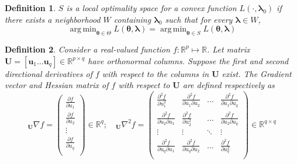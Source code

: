 \documentclass[12pt]{article}
\newtheorem{definition}{Definition}
\DeclareMathOperator*{\argmin}{arg\,min}
\begin{document}
\begin{definition}
$S$ is a local optimality space for a convex function $L(\cdot, \boldsymbol \lambda_0)$ if there exists a neighborhood $W$ containing $\boldsymbol \lambda_0$ such that for every $\boldsymbol \lambda \in W$,
\begin{equation}
\argmin_{\boldsymbol \theta \in \Theta} L(\boldsymbol \theta, \boldsymbol \lambda) =
\argmin_{\boldsymbol \theta \in S} L(\boldsymbol \theta, \boldsymbol \lambda)
\end{equation}
\end{definition}

\begin{definition}
Consider a real-valued function $f: \mathbb{R}^p \mapsto \mathbb{R}$. Let matrix $\boldsymbol U = [ \boldsymbol u_1 \hdots \boldsymbol u_q ] \in \mathbb{R}^{p \times q}$ have orthonormal columns. Suppose the first and second directional derivatives of $f$ with respect to the columns in $\boldsymbol U$ exist. The Gradient vector and Hessian matrix of $f$ with respect to $\boldsymbol U$ are defined respectively as
\begin{equation}\label{eq:hess}
_{\boldsymbol U} \nabla f  =
\left (
\begin{array}{c}
\frac{\partial f}{\partial  u_1} \\
\frac{\partial f}{\partial u_2} \\
\vdots\\
\frac{\partial f}{\partial u_q}\\
\end{array}
\right ) \in \mathbb{R}^q;
\quad
_{\boldsymbol U}\nabla^2 f =
\left (
\begin{array}{cccc}
\frac{\partial^2 f}{\partial u_1^2} & \frac{\partial^2 f}{\partial u_1 \partial u_2} & ...  & \frac{\partial^2 f}{\partial u_1 \partial u_q} \\
\frac{\partial^2 f}{\partial u_2 \partial u_1} & \frac{\partial^2 f}{\partial u_2^2} & ...  & \frac{\partial^2 f}{\partial u_2 \partial u_q} \\
\vdots & \vdots &  \ddots & \vdots \\
\frac{\partial^2 f}{\partial u_q \partial u_1} & \frac{\partial^2 f}{\partial u_q \partial u_2} & ...  & \frac{\partial^2 f}{\partial u_q^2} \\
\end{array}
\right ) \in \mathbb{R}^{q \times q}
\end{equation}
\end{definition}
\end{document}
